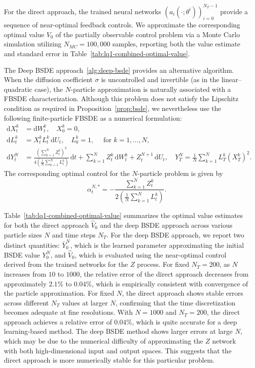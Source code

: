 \documentclass[11pt]{article}
\numberwithin{equation}{section}
\theoremstyle{plain}
\theoremstyle{definition}
\theoremstyle{remark}
\newcommand{\dd}{\mathrm{d}}
\begin{document}
	For the direct approach, the trained neural networks $(a_i(\cdot; \theta^i))_{i=0}^{N_T-1}$ provide a sequence of near-optimal feedback controls. We approximate the corresponding optimal value $V_0$ of the partially observable control problem via a Monte Carlo simulation utilizing $N_{MC}=100,000$ samples, reporting both the value estimate and standard error in Table~\ref{tab:lq1-combined-optimal-value}. 
	
		The Deep BSDE approach~\ref{alg:deep-bsde} provides an alternative algorithm. When the diffusion coefficient $\sigma$ is uncontrolled and invertible (as in the linear--quadratic case), the $N$-particle approximation is naturally associated with a FBSDE characterization. Although this problem does not satisfy the Lipschitz condition as required in Proposition~\ref{prop:bsde}, we nevertheless use the following finite-particle FBSDE as a numerical formulation:
	\begin{equation*}
		\begin{aligned}
			\dd X_t^k &= \dd W_t^k,\quad X_0^k = 0,  \\
			\dd L_t^k &= X_t^k L_t^k \,\dd U_t, \quad L_0^k = 1, \quad \text{ for }k=1,\dots,N, \\
			\dd Y_t^N &= \frac{(\sum_{k=1}^N Z_t^k)^2}{4(\frac{1}{N}\sum_{k=1}^N L_t^k)}\,\dd t + \sum_{k=1}^N Z_t^k\,\dd W_t^k + Z_t^{N+1}\,\dd U_t, \quad Y_T^N = \frac{1}{N}\sum_{k=1}^N L_T^k (X_T^k)^2. 
		\end{aligned}
	\end{equation*}
	The corresponding optimal control for the $N$-particle problem is given by 
	\begin{equation*}
		\alpha_t^{N, *} = -\frac{\sum_{k=1}^N Z_t^k}{2(\frac{1}{N}\sum_{k=1}^N L_t^k)}.
	\end{equation*}
	
		Table~\ref{tab:lq1-combined-optimal-value} summarizes the optimal value estimates for both the direct approach $\hat{V}_0$ and the deep BSDE approach across various particle sizes $N$ and time steps $N_T$. For the deep BSDE approach, we report two distinct quantities: $\bar{Y}_0^N$, which is the learned parameter approximating the initial BSDE value $Y_0^N$, and $\hat{V}_0$, which is evaluated using the near-optimal control derived from the trained networks for the $Z$ process. For fixed $N_T=200$, as $N$ increases from $10$ to $1000$, the relative error of the direct approach decreases from approximately $2.1\%$ to $0.04\%$, which is empirically consistent with convergence of the particle approximation. For fixed $N$, the direct approach shows stable errors across different $N_T$ values at larger $N$, confirming that the time discretization becomes adequate at fine resolutions. With $N=1000$ and $N_T=200$, the direct approach achieves a relative error of $0.04\%$, which is quite accurate for a deep learning-based method. The deep BSDE method shows larger errors at large $N$, which may be due to the numerical difficulty of approximating the $Z$ network with both high-dimensional input and output spaces. This suggests that the direct approach is more numerically stable for this particular problem.
	
\end{document}
